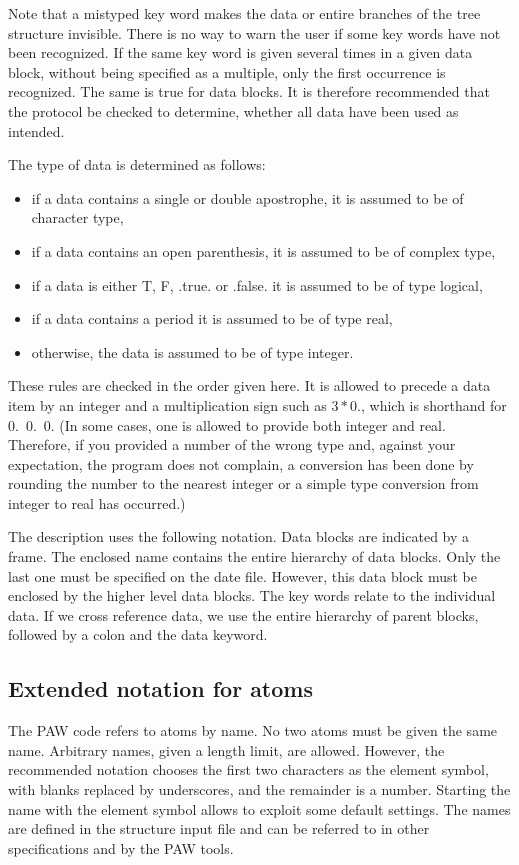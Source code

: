 \documentclass[final,12pt]{article}
\begin{document}
Note that a mistyped key word makes the data or entire branches of the
tree structure invisible. There is no way to warn the user if some key
words have not been recognized.  If the same key word is given several
times in a given data block, without being specified as a multiple,
only the first occurrence is recognized.  The same is true for data
blocks. It is therefore recommended that the protocol be checked to
determine, whether all data have been used as intended.

The type of data is determined as follows:
\begin{itemize}
\item if a data contains a single or double apostrophe, it is
  assumed to be of character type,
\item if a data contains an open parenthesis, it is assumed to be of
  complex type,
\item if a data is either T, F, .true. or .false. it is assumed to be of
  type logical,
\item if a data contains a period it is assumed to be of type real,
\item otherwise, the data is assumed to be of type integer.
\end{itemize}
These rules are checked in the order given here.  It is allowed to
precede a data item by an integer and a multiplication sign such as
$3*0.$, which is shorthand for 0.\ 0.\ 0. (In some cases, one is
allowed to provide both integer and real. Therefore, if you provided a
number of the wrong type and, against your expectation, the program
does not complain, a conversion has been done by rounding the number
to the nearest integer or a simple type conversion from integer to
real has occurred.)

The description uses the following notation. Data blocks are
indicated by a frame. The enclosed name contains the entire
hierarchy of data blocks. Only the last one must be specified on the
date file. However, this data block must be enclosed by the higher
level data blocks. The key words relate to the individual data. If we
cross reference data, we use the entire hierarchy of parent
blocks, followed by a colon and the data keyword.

%
\subsection{Extended notation for atoms}
\label{sec:extendedatomnotation}
The PAW code refers to atoms by name. No two atoms must be given the
same name. Arbitrary names, given a length limit, are allowed.
However, the recommended notation chooses the first two characters as
the element symbol, with blanks replaced by underscores, and the
remainder is a number. Starting the name with the element symbol
allows to exploit some default settings. The names are defined in the
structure input file and can be referred to in other specifications
and by the PAW tools.
\end{document}

